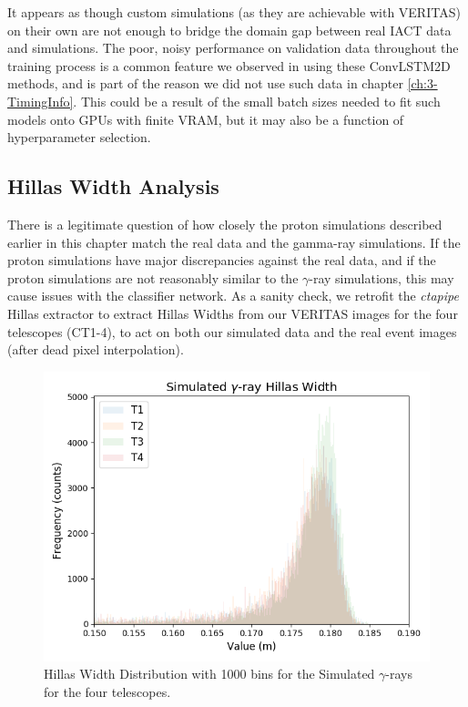 It appears as though custom simulations (as they are achievable with VERITAS) on their own are not enough to bridge the domain gap between real IACT data and simulations. The poor, noisy performance on validation data throughout the training process is a common feature we observed in using these ConvLSTM2D methods, and is part of the reason we did not use such data in chapter \ref{ch:3-TimingInfo}. This could be a result of the small batch sizes needed to fit such models onto GPUs with finite VRAM, but it may also be a function of hyperparameter selection.

\subsection{Hillas Width Analysis}
There is a legitimate question of how closely the proton simulations described earlier in this chapter match the real data and the gamma-ray simulations. If the proton simulations have major discrepancies against the real data, and if the proton simulations are not reasonably similar to the $\gamma$-ray simulations, this may cause issues with the classifier network. As a sanity check, we retrofit the \textit{ctapipe} Hillas extractor to extract Hillas Widths from our VERITAS images for the four telescopes (CT1-4), to act on both our simulated data and the real event images (after dead pixel interpolation).
\begin{figure}[ht] 
        \centering \includegraphics[width=\columnwidth]{figures/Gamma2_int.png}

        \caption{
                \label{fig:Gamma2_int} Hillas Width Distribution with 1000 bins for the Simulated $\gamma$-rays for the four telescopes.
        }
\end{figure}
